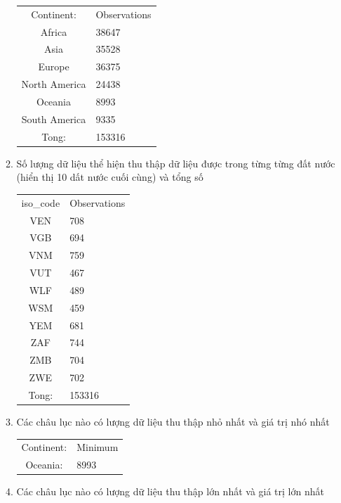\documentclass[a4paper]{article}
\theoremstyle{definition}
\begin{document}
\begin{enumerate}[i)]
\begin{enumerate}[1)]
    \begin{center}
      \begin{tabular}{ c l }
      Continent: &    Observations \\
      Africa     &        38647    \\  
      Asia       &        35528    \\   
      Europe     &        36375    \\   
   North America &        24438    \\   
   Oceania       &        8993     \\   
   South America &        9335     \\   
   Tong:         &        153316   
     \end{tabular}
    \end{center}
    \item Số lượng dữ liệu thể hiện thu thập dữ liệu được trong từng từng đất nước (hiển thị 10 dất nước cuối cùng) và tổng số
    \begin{center}
      \begin{tabular}{ c l }
iso\_code & Observations \\ 
   VEN &     708         \\
   VGB &     694         \\
   VNM &     759         \\
   VUT &     467         \\
   WLF &     489         \\
   WSM &     459         \\
   YEM &     681         \\
   ZAF &     744         \\ 
   ZMB &     704         \\
   ZWE &     702         \\
 Tong: &   153316  
      \end{tabular}
    \end{center}
    \item Các châu lục nào có lượng dữ liệu thu thập nhỏ nhất và giá trị nhó nhất
    \begin{center}
      \begin{tabular}{ c l }
  Continent:  & Minimum   \\
   Oceania:   &      8993
      \end{tabular}
    \end{center}
    \item Các châu lục nào có lượng dữ liệu thu thập lớn nhất và giá trị lớn nhất 

\end{enumerate}
\end{enumerate}
\end{document}
